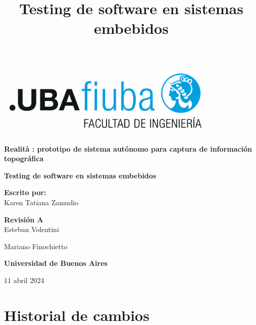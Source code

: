 \documentclass[12pt,a4paper, twoside]{article} %
\date{}
\title{Testing de software en sistemas embebidos}
\begin{document}
\renewcommand\refname{}
\renewcommand{\contentsname}{Tabla de contenido}
\newpage

\begin{titlepage}
    \begin{center}
        \vspace*{1cm}

                \includegraphics[width=0.8\textwidth]{Figuras/logoFIUBA.pdf} %

        \vspace{1.5cm}

        \textbf{\LARGE Realità : prototipo de sistema autónomo para captura de información topográfica}

        \vspace{4cm}
        \textbf{\Large Testing de software en sistemas embebidos}

        \vspace{1.5cm}


        \textbf{\Large Escrito por:}\\
        \large Karen Tatiana Zamudio

        \vspace{0.8cm}

        \textbf{\Large Revisión A}\\
        \large Esteban Volentini

        \large Mariano Finochietto

        \vfill

        \textbf{\Large Universidad de Buenos Aires}\\
        \vspace{0.2cm}

        \large 11 abril 2024

    \end{center}
\end{titlepage}
\newpage

\section*{Historial de cambios}
\label{sec:registro}
\end{document}
